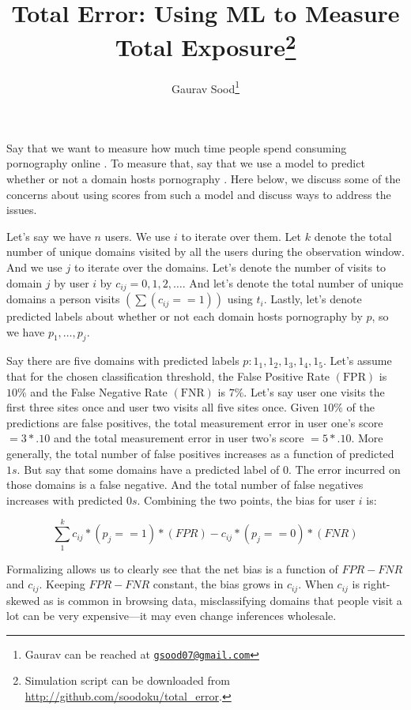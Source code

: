 \documentclass[12pt, letterpaper]{article}
\title{Total Error: Using ML to Measure Total Exposure\footnote{Simulation script can be downloaded from \url{http://github.com/soodoku/total_error}.}}
\author{Gaurav Sood\thanks{Gaurav can be reached at \href{mailto:gsood07@gmail.com}\texttt{gsood07@gmail.com}}}
\date{}
\begin{document}
\maketitle
\doublespacing
{}

Say that we want to measure how much time people spend consuming pornography online \citep[e.g.,][]{shen2023holier}. To measure that, say that we use a model to predict whether or not a domain hosts pornography \citep[e.g.,][]{chintalapati2022}. Here below, we discuss some of the concerns about using scores from such a model and discuss ways to address the issues.

Let's say we have $n$ users. We use $i$ to iterate over them. Let $k$ denote the total number of unique domains visited by all the users during the observation window. And we use $j$ to iterate over the domains. Let's denote the number of visits to domain $j$ by user $i$ by $c_{i j}=0,1,2, \ldots$. And let's denote the total number of unique domains a person visits $\left(\sum\left(c_{i j}==1\right)\right)$ using $t_{i}$. Lastly, let's denote predicted labels about whether or not each domain hosts pornography by $p$, so we have $p_{1}, \ldots, p_{j}$.

Say there are five domains with predicted labels $p: 1_{1}, 1_{2}, 1_{3}, 1_{4}, 1_{5}$. Let's assume that for the chosen classification threshold, the False Positive Rate $(\mathrm{FPR})$ is $10\%$ and the False Negative Rate $(\mathrm{FNR})$ is $7\%$. Let's say user one visits the first three sites once and user two visits all five sites once. Given $10\%$ of the predictions are false positives, the total measurement error in user one's score $=3*.10$ and the total measurement error in user two's score $=5 *.10$. More generally, the total number of false positives increases as a function of predicted $1s$. But say that some domains have a predicted label of 0. The error incurred on those domains is a false negative. And the total number of false negatives increases with predicted $0s$. Combining the two points, the bias for user $i$ is:

$$
\sum_{1}^{k} c_{ij} *\left(p_{j}==1\right) *(FPR)-c_{ij} *\left(p_{j}==0\right) *(FNR)
$$

Formalizing allows us to clearly see that the net bias is a function of $FPR-FNR$ and $c_{ij}$. Keeping $FPR-FNR$ constant, the bias grows in $c_{ij}$. When $c_{ij}$ is right-skewed as is common in browsing data, misclassifying domains that people visit a lot can be very expensive---it may even change inferences wholesale.
\end{document}

